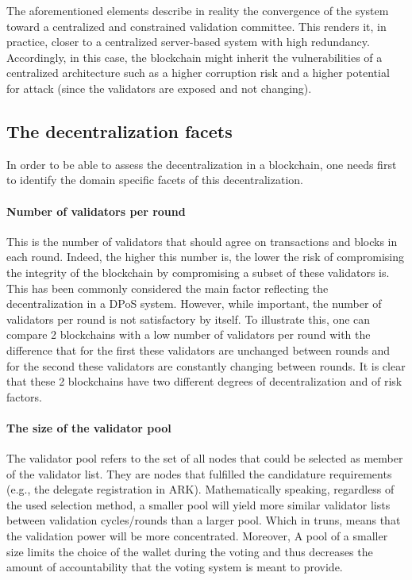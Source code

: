 \documentclass{article}
\begin{document}
The aforementioned elements describe in reality the convergence of the system toward a centralized and constrained validation committee. This renders it, in practice, closer to a centralized server-based system with high redundancy. Accordingly, in this case, the blockchain might inherit the vulnerabilities of a centralized architecture such as a higher corruption risk and a higher potential for attack (since the validators are exposed and not changing).

\subsection{The decentralization facets}
In order to be able to assess the decentralization in a blockchain, one needs first to identify the domain specific facets of this decentralization. 

\paragraph{Number of validators per round}
This is the number of validators that should agree on transactions and blocks in each round. Indeed, the higher this number is, the lower the risk of compromising the integrity of the blockchain by compromising a subset of these validators is. This has been commonly considered the main factor reflecting the decentralization in a DPoS system.  However, while important, the number of validators per round is not satisfactory by itself. To illustrate this, one can compare 2 blockchains with a low number of validators per round with the difference that for the first these validators are unchanged between rounds and for the second these validators are constantly changing between rounds. It is clear that these 2 blockchains have two different degrees of decentralization and of risk factors.

\paragraph{The size of the validator pool} 
The validator pool refers to the set of all nodes that could be selected as member of the validator list. They are nodes that fulfilled the candidature requirements (e.g., the delegate registration in ARK). Mathematically speaking, regardless of the used selection method, a smaller pool will yield more similar validator lists between validation cycles/rounds than a larger pool. Which in truns, means that the validation power will be more concentrated. Moreover, A pool of a smaller size limits the choice of the wallet during the voting and thus decreases the amount of accountability that the voting system is meant to provide. 
\end{document}
